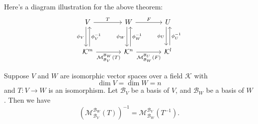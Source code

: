 \documentclass{ctexart}
\begin{document}
	\begin{myrmk}
		Here's a diagram illustration for the above theorem:
		\[
		\begin{tikzcd}[row sep=large, column sep=large]
		V
		\arrow[r, "T"]
		\arrow[d, xshift=-0.6ex, "\phi_V"']
		& W
		\arrow[r, "F"]
		\arrow[d, xshift=-0.6ex, "\phi_W"']
		& U
		\arrow[d, xshift=-0.6ex, "\phi_U"']
		\\
		\mathcal{K}^m
		\arrow[r, "\mathcal{M}^{\mathcal{B}_W}_{\mathcal{B}_V}(T)"']
		\arrow[u, xshift=0.6ex, "\phi_V^{-1}" ']
		& \mathcal{K}^n
		\arrow[r, "\mathcal{M}^{\mathcal{B}_U}_{\mathcal{B}_W}(F)"']
		\arrow[u, xshift=0.6ex, "\phi_W^{-1}"']
		& \mathcal{K}^l
		\arrow[u, xshift=0.6ex, "\phi_U^{-1}"']
		\end{tikzcd}
		\]
	\end{myrmk}
	\begin{mypro}
		Suppose $V$ and $W$ are isomorphic vector spaces over a field $\mathcal{K}$ with
		\[
		\dim V = \dim W = n
		\]
		and $T: V \to W$ is an isomorphism. Let $\mathcal{B}_V$ be a basis of $V$, and $\mathcal{B}_W$ be a basis of $W$. Then we have
		\[
		\left( \mathcal{M}^{\mathcal{B}_W}_{\mathcal{B}_V}(T) \right)^{-1} =
		\mathcal{M}^{\mathcal{B}_V}_{\mathcal{B}_W}(T^{-1}).
		\]
	\end{mypro}
\end{document}
